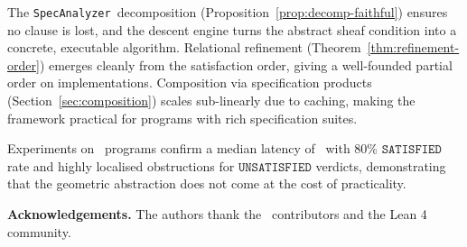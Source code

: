 \documentclass[11pt]{article}
\newcommand{\SAT}{\texttt{SATISFIED}}               %
\newcommand{\UNSAT}{\texttt{UNSATISFIED}}           %
\newcommand{\SpecAnalyzer}{\texttt{SpecAnalyzer}}
\begin{document}
The \SpecAnalyzer\ decomposition (Proposition~\ref{prop:decomp-faithful})
ensures no clause is lost, and the descent engine turns the abstract
sheaf condition into a concrete, executable algorithm.
Relational refinement (Theorem~\ref{thm:refinement-order}) emerges
cleanly from the satisfaction order, giving a well-founded partial
order on implementations.
Composition via specification products (Section~\ref{sec:composition})
scales sub-linearly due to caching, making the framework practical for
programs with rich specification suites.

Experiments on \numspec\ programs confirm a median latency of \medtime\
with 80\% $\SAT$ rate and highly localised obstructions for $\UNSAT$
verdicts, demonstrating that the geometric abstraction does not come
at the cost of practicality.

\medskip
\noindent\textbf{Acknowledgements.}
The authors thank the \JuGeo\ contributors and the Lean 4 community.
\end{document}
